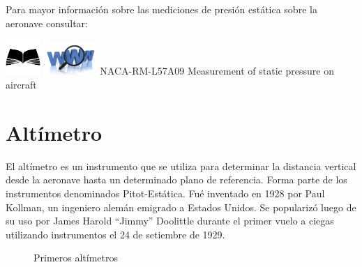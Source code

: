 \documentclass[a4paper,12pt,twoside]{article}
\begin{document}
Para mayor informaci\'on sobre las mediciones de presi\'on est\'atica sobre la aeronave consultar:

\href{run:biblio/naca-rm-l57a09.pdf}{\includegraphics[width=0.1\textwidth]{imagenes/iconos/libro.png}}
\hspace{3mm}
\href{http://naca.central.cranfield.ac.uk/reports/1957/naca-rm-l57a09.pdf}{\includegraphics[width=0.15\textwidth]{imagenes/iconos/www-logo.png}}
NACA-RM-L57A09 
Measurement of static pressure on aircraft



\newpage

\section{Alt\'imetro}
\label{altimetro}

El altímetro es un instrumento que se utiliza para
determinar la distancia vertical desde la aeronave hasta un determinado plano de
referencia. Forma parte de los instrumentos denominados Pitot-Estática.
Fu\'e inventado en 1928 por Paul Kollman, un ingeniero alem\'an emigrado a
Estados Unidos. Se populariz\'o luego de su uso por James Harold ``Jimmy'' Doolittle
durante el primer vuelo a ciegas utilizando instrumentos el 24 de setiembre de 1929.

\begin{figure}[!h]
  \centering

  \caption{Primeros alt\'imetros}
  \label{fig:kollsman}
\end{figure}
\end{document}
